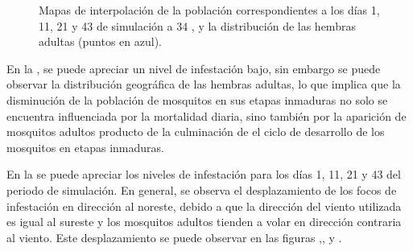 \begin{figure}[!htbp]
    \caption{\label{fig:niveles-infestacion-34} Mapas de interpolación de la población correspondientes a los días 1, 11, 21 y 43 de simulación a 34 \textcelsius, y la distribución de las hembras adultas (puntos en azul). }
\end{figure}

En la , se puede apreciar un nivel de infestación bajo, sin
embargo se puede observar la distribución geográfica de las hembras adultas, lo que implica que la
disminución de la población de mosquitos en sus etapas inmaduras no solo se encuentra influenciada
por la mortalidad diaria, sino también por la aparición de mosquitos adultos producto de la
culminación de el ciclo de desarrollo de los mosquitos en etapas inmaduras.

En la  se puede apreciar los niveles de infestación
para los días 1, 11, 21 y 43  del periodo de simulación. En general, se observa el
desplazamiento de los focos de infestación en dirección al noreste, debido a que la dirección del
viento utilizada es igual al sureste y los mosquitos adultos tienden a volar en dirección
contraria al viento. Este desplazamiento se puede observar en las figuras
,,
 y .
